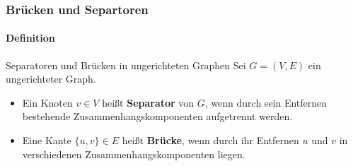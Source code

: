 \begin{frame}
	\frametitle{Brücken und Separtoren}
	\framesubtitle{Definition}
	\begin{KITinfoblock}{Separatoren und Brücken in ungerichteten Graphen}
		Sei $G = (V,E)$ ein ungerichteter Graph.
	\begin{itemize}
		\item  Ein Knoten $v \in V$ heißt \textbf{Separator} von $G$, wenn  durch sein Entfernen bestehende Zusammenhangskomponenten aufgetrennt werden.
		\item  Eine Kante $\{u,v\} \in E$ heißt \textbf{Brücke}, wenn durch ihr Entfernen  $u$ und $v$ in verschiedenen Zusammenhangskomponenten liegen.
	\end{itemize}
	\end{KITinfoblock}
	
\end{frame}

